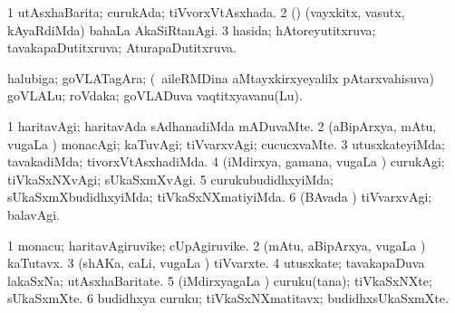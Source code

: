 \noindent
\gl{\pagu}
\bmng
{} 
\bnum
\num{1}  utAsxhaBarita; curukAda; tiVvorxVtAsxhada. 
\num{2}  (\AmA) (vayxkitx, vasutx, kAyaRdiMda) bahaLa AkaSiRtanAgi. 
\num{3}  hasida; hAtoreyutitxruva; tavakapaDutitxruva; AturapaDutitxruva. 
\enum
\emng
\eentry

\bentry
{}
\gl{\nA}
\bmng
halubiga; goVLATagAra; (\kanmu\ aileRMDina aMtayxkirxyeyalilx pAtarxvahisuva) goVLALu; roVdaka; goVLADuva vaqtitxyavanu(Lu). 
\emng
\eentry

\bentry
{}
\gl{\kirxvi}
\bmng
\bnum
\num{1} haritavAgi; haritavAda sAdhanadiMda mADuvaMte. 
\num{2} (aBipArxya, mAtu, \mo vugaLa \vi) monacAgi; kaTuvAgi; tiVvarxvAgi; cucucxvaMte. 
\num{3} utusxkateyiMda; tavakadiMda; tivorxVtAsxhadiMda. 
\num{4} (iMdirxya, gamana, \mo vugaLa \vi) curukAgi; tiVkaSxNXvAgi; sUkaSxmXvAgi. 
\num{5} curukubudidhxyiMda; sUkaSxmXbudidhxyiMda; tiVkaSxNXmatiyiMda. 
\num{6} (BAvada \vi) tiVvarxvAgi; balavAgi. 
\enum
\emng
\eentry

\bentry
{}
\gl{\nA}
\bmng
\bnum
\num{1} monacu; haritavAgiruvike; cUpAgiruvike. 
\num{2} (mAtu, aBipArxya, \mo vugaLa \vi) kaTutavx. 
\num{3} (shAKa, caLi, \mo vugaLa \vi) tiVvarxte. 
\num{4} utusxkate; tavakapaDuva lakaSxNa; utAsxhaBaritate. 
\num{5} (iMdirxyagaLa \vi) curuku(tana); tiVkaSxNXte; sUkaSxmXte. 
\num{6} budidhxya curuku; tiVkaSxNXmatitavx; budidhxsUkaSxmXte. 
\enum
\emng
\eentry

\bentry
{}
\gl{\kirx}


